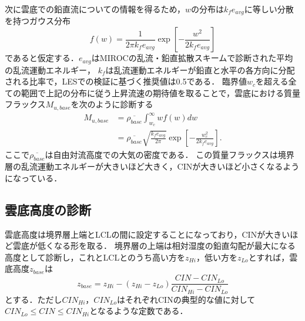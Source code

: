 \documentclass[platex, dvipdfmx]{jsarticle}
\begin{document}

次に雲底での鉛直流についての情報を得るため，$w$の分布は$k_f e_{avg}$に等しい分散を持つガウス分布
\begin{equation}
    f(w) = \frac{1}{2\pi k_f e_{avg}}\exp\left[ -\frac{w^2}{2k_fe_{avg}}\right]
\end{equation}
であると仮定する．$e_{avg}$はMIROCの乱流・鉛直拡散スキームで診断された平均の乱流運動エネルギー，
$k_f$は乱流運動エネルギーが鉛直と水平の各方向に分配される比率で，LESでの検証に基づく推奨値は0.5である．
臨界値$w_c$を超える全ての範囲で上記の分布に従う上昇流速の期待値を取ることで，雲底における質量フラックス$M_{u,base}$を次のように診断する
\begin{align}
    M_{u,base}&=\overline{\rho_{base}}\int_{w_c}^{\infty}wf(w)dw \\   
    &=\overline{\rho_{base}}\sqrt{\frac{k_f e_{avg}}{2\pi}}\exp\left[-\frac{w_c^2}{2k_fe_{avg}}\right].
\end{align}
ここで$\overline{\rho_{base}}$は自由対流高度での大気の密度である．
この質量フラックスは境界層の乱流運動エネルギーが大きいほど大きく，CINが大きいほど小さくなるようになっている．

\subsection{雲底高度の診断}
雲底高度は境界層上端とLCLの間に設定することになっており，CINが大きいほど雲底が低くなる形を取る．
境界層の上端は相対湿度の鉛直勾配が最大になる高度として診断し，これとLCLとのうち高い方を$z_{Hi}$，低い方を$z_{Lo}$とすれば，雲底高度$z_{base}$は
\begin{equation}
    z_{base} = z_{Hi} - (z_{Hi}-z_{Lo})\frac{CIN-CIN_{Lo}}{CIN_{Hi} - CIN_{Lo}}    
\end{equation}
とする．ただし$CIN_{Hi}$，$CIN_{Lo}$はそれぞれCINの典型的な値に対して$CIN_{Lo}\le CIN \le CIN_{Hi}$となるような定数である．
\end{document}
